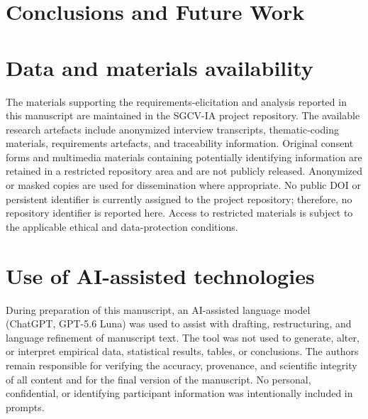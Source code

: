 \documentclass[pdflatex,sn-mathphys-num,Numbered]{sn-jnl}
\begin{document}

\section{Conclusions and Future Work}\label{sec7}


\backmatter

\section*{Data and materials availability}
The materials supporting the requirements-elicitation and analysis reported in this manuscript are maintained in the SGCV-IA project repository. The available research artefacts include anonymized interview transcripts, thematic-coding materials, requirements artefacts, and traceability information. Original consent forms and multimedia materials containing potentially identifying information are retained in a restricted repository area and are not publicly released. Anonymized or masked copies are used for dissemination where appropriate. No public DOI or persistent identifier is currently assigned to the project repository; therefore, no repository identifier is reported here. Access to restricted materials is subject to the applicable ethical and data-protection conditions.

\section*{Use of AI-assisted technologies}
During preparation of this manuscript, an AI-assisted language model (ChatGPT, GPT-5.6 Luna) was used to assist with drafting, restructuring, and language refinement of manuscript text. The tool was not used to generate, alter, or interpret empirical data, statistical results, tables, or conclusions. The authors remain responsible for verifying the accuracy, provenance, and scientific integrity of all content and for the final version of the manuscript. No personal, confidential, or identifying participant information was intentionally included in prompts.
\end{document}
